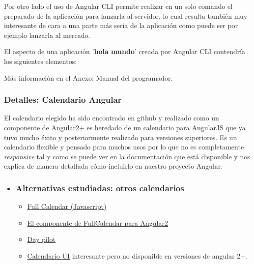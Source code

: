 Por otro lado el uso de Angular CLI permite realizar en un solo comando el preparado de la aplicación para lanzarla al servidor, lo cual resulta también muy interesante de cara a una parte más seria de la aplicación como puede ser por ejemplo lanzarla al mercado.

El aspecto de una aplicación '\textbf{hola mundo}' creada por Angular CLI contendría los siguientes elementos:


Más información en el Anexo: Manual del programador. 

\subsubsection{Detalles: Calendario Angular}\label{detalle_calendario}
El calendario elegido ha sido encontrado en github y realizado como un componente de Angular2+ es heredado de un calendario para AngularJS que ya tuvo mucho éxito y posteriormente realizado para versiones superiores. Es un calendario flexible y pensado para muchos usos por lo que no es completamente \emph{responsive} tal y como se puede ver en la documentación \cite{calendariodocs}  que está disponible y nos explica de manera detallada cómo incluirlo en nuestro proyecto Angular.

\begin{itemize}
	\item \subsubsection{Alternativas estudiadas: otros calendarios} 
	\begin{itemize}
		\item \href{https://fullcalendar.io/}{Full Calendar (Javascript)}
		\item \href{https://github.com/nekken/ng2-fullcalendar}{El componente de FullCalendar para Angular2}
		\item \href{https://doc.daypilot.org/calendar/angular-2/}{Day pilot }
		\item \href{http://angular-ui.github.io/ui-calendar/}{Calendario UI} interesante pero no disponible en versiones de angular 2+.
	\end{itemize}
	\end{itemize}


